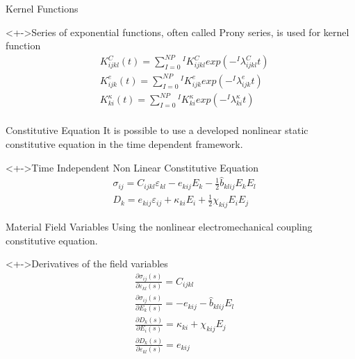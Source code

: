 \documentclass{beamer}
\begin{document}
\begin{frame}{Kernel Functions}
\begin{block}<+->{Series of exponential functions, often called Prony series, is used for kernel function}
\begin{equation}
\label{EQN:LrgKProney}
\begin{aligned}
&K_{ijkl}^C(t) =\sum_{I=0}^{NP}{}^{I}K_{ijkl}^{C} exp(-{}^{I}\lambda_{ijkl}^{C}t) \\
&K_{ijk}^e(t) =\sum_{I=0}^{NP}{}^{I}K_{ijk}^{e} exp(-{}^{I}\lambda_{ijk}^{e}t) \\
&K_{ki}^\kappa(t) =\sum_{I=0}^{NP}{}^{I}K_{ki}^{\kappa} exp(-{}^{I}\lambda_{ki}^{\kappa}t) \\
\end{aligned}
\end{equation}
\end{block} 
\end{frame}

\begin{frame}{Constitutive Equation}
It is possible to use a developed nonlinear static constitutive equation in the
time dependent framework.
\begin{block}<+->{Time Independent Non Linear Constitutive Equation \cite{Tiersten1993}}
\begin{equation}
\begin{aligned}
&\sigma_{ij}=C_{ijkl}\varepsilon_{kl}-e_{kij}E_k-\frac{1}{2}\widehat{b}_{klij}E_k E_l
\\
&D_k=e_{kij}\varepsilon_{ij}+\kappa_{ki}E_i+\frac{1}{2}\chi_{kij}E_i E_j
\end{aligned}
\label{EQN:NonLinearElectroMechancialConstants}
\end{equation}
\end{block} 
\end{frame}

\begin{frame}{Material Field Variables}
Using the nonlinear electromechanical coupling constitutive equation.
\begin{block}<+->{Derivatives of the field variables}
\begin{equation}
\begin{aligned}
&\frac{\partial \sigma_{ij}(s)}{\partial \varepsilon_{kl}(s)}=C_{ijkl} \\
&\frac{\partial \sigma_{ij}(s)}{\partial E_{k}(s)}=-e_{kij}-\widehat{b}_{klij} E_l\\
&\frac{\partial D_{k}(s)}{\partial E_{i}(s)}=\kappa_{ki}+\chi_{kij} E_j\\
&\frac{\partial D_{k}(s)}{\partial \varepsilon_{kl}(s)}=e_{kij}
\end{aligned}
\label{EQN:Non_LinearLinear_Constants}
\end{equation}
\end{block} 

\end{frame}
\end{document}
